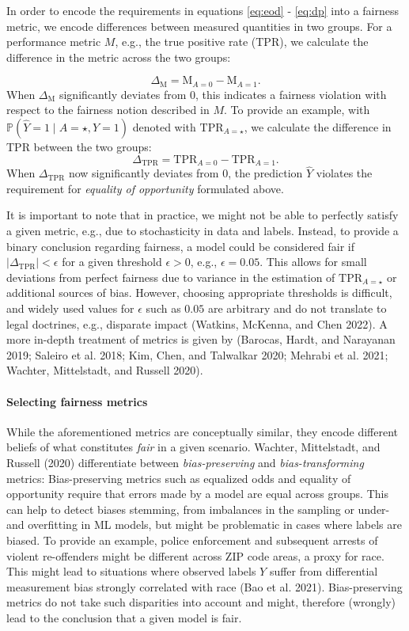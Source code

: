 In order to encode the requirements in equations \eqref{eq:eod} - \eqref{eq:dp} into a fairness metric, we encode differences between measured quantities in two groups.
For a performance metric \(M\), e.g., the true positive rate (TPR), we calculate the difference in the metric across the two groups:

\[
\Delta_{\mathrm{M}} = \mathrm{M}_{A=0} - \mathrm{M}_{A=1}.
\]
When \(\Delta_{\mathrm{M}}\) significantly deviates from \(0\), this indicates a fairness violation with respect to the fairness notion described in \(M\).
To provide an example, with \(\mathbb{P}\left(\hat{Y} = 1 \mid A = \star, Y = 1\right)\) denoted with \(\mathrm{TPR}_{A=\star}\), we calculate the difference in TPR between the two groups:
\[
\Delta_{\mathrm{TPR}} = \mathrm{TPR}_{A=0} - \mathrm{TPR}_{A=1}.
\]
When \(\Delta_{\mathrm{TPR}}\) now significantly deviates from \(0\), the prediction \(\hat{Y}\) violates the requirement for \emph{equality of opportunity} formulated above.

It is important to note that in practice, we might not be able to perfectly satisfy a given metric, e.g., due to stochasticity in data and labels.
Instead, to provide a binary conclusion regarding fairness, a model could be considered fair if \(|\Delta_{\mathrm{TPR}}| < \epsilon\) for a given threshold \(\epsilon > 0\), e.g., \(\epsilon = 0.05\).
This allows for small deviations from perfect fairness due to variance in the estimation of \(\mathrm{TPR}_{A=\star}\) or additional sources of bias.
However, choosing appropriate thresholds is difficult, and widely used values for \(\epsilon\) such as \(0.05\) are arbitrary and do not translate to legal doctrines, e.g., disparate impact (Watkins, McKenna, and Chen 2022).
A more in-depth treatment of metrics is given by (Barocas, Hardt, and Narayanan 2019; Saleiro et al. 2018; Kim, Chen, and Talwalkar 2020; Mehrabi et al. 2021; Wachter, Mittelstadt, and Russell 2020).

\hypertarget{selecting-fairness-metrics}{%
\paragraph{Selecting fairness metrics}\label{selecting-fairness-metrics}}

While the aforementioned metrics are conceptually similar, they encode different beliefs of what constitutes \emph{fair} in a given scenario.
Wachter, Mittelstadt, and Russell (2020) differentiate between \emph{bias-preserving} and \emph{bias-transforming} metrics:
Bias-preserving metrics such as equalized odds and equality of opportunity require that errors made by a model are equal across groups.
This can help to detect biases stemming, from imbalances in the sampling or under- and overfitting in ML models, but might be problematic in cases where labels are biased.
To provide an example, police enforcement and subsequent arrests of violent re-offenders might be different across ZIP code areas, a proxy for race.
This might lead to situations where observed labels \(Y\) suffer from differential measurement bias strongly correlated with race (Bao et al. 2021).
Bias-preserving metrics do not take such disparities into account and might, therefore (wrongly) lead to the conclusion that a given model is fair.

